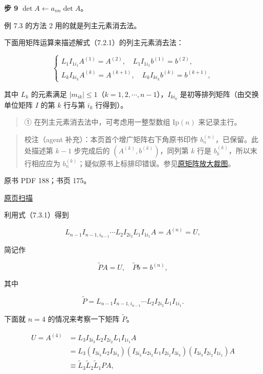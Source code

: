 \documentclass[
  10pt,
  fontset=fandol]{ctexart}
\begin{document}
\textbf{步 9} \(\det A\leftarrow a_{nn}\det A\)。

例 7.3 的方法 2 用的就是列主元素消去法。

下面用矩阵运算来描述解式（7.2.1）的列主元素消去法：

\[
\begin{cases}
L_1I_{1i_1}A^{(1)}=A^{(2)},\quad L_1I_{1i_1}b^{(1)}=b^{(2)},\\
L_kI_{ki_k}A^{(k)}=A^{(k+1)},\quad L_kI_{ki_k}b^{(k)}=b^{(k+1)},
\end{cases}
\tag{7.3.1}
\]

其中 \(L_k\) 的元素满足 \(|m_{ik}|\le1\)（\(k=1,2,\cdots,n-1\)），\(I_{ki_k}\) 是初等排列矩阵（由交换单位矩阵 \(I\) 的第 \(k\) 行与第 \(i_k\) 行得到）。

\begin{quote}
① 在列主元素消去法中，可考虑用一整型数组 \(\mathrm{Ip}(n)\) 来记录主行。
\end{quote}

\begin{quote}
校注（agent 补充）：本页首个增广矩阵右下角原书印作 \(b_n^{(n)}\)，已保留。此处描述第 \(k-1\) 步完成后的 \((A^{(k)},b^{(k)})\)，同列第 \(k\) 行是 \(b_k^{(k)}\)，所以末行相应应为 \(b_n^{(k)}\)；疑似原书上标排印错误。参见\href{/Users/xiangjunfeng/Desktop/数值计算专用/numerical-analysis/book/staging/ch07a/assets/pdf-187-rhs-detail.png}{原矩阵放大裁图}。
\end{quote}

\clearpage

原书 PDF 188；书页 175。

\href{/Users/xiangjunfeng/Desktop/数值计算专用/numerical-analysis/book/source-images/pdf-188.jpeg}{原页扫描}

利用式（7.3.1）得到

\[L_{n-1}I_{n-1,i_{n-1}}\cdots L_2I_{2i_2}L_1I_{1i_1}A=A^{(n)}=U,\]

简记作

\[\widetilde{P}A=U,\quad\widetilde{P}b=b^{(n)},\]

其中

\[\widetilde{P}=L_{n-1}I_{n-1,i_{n-1}}\cdots L_2I_{2i_2}L_1I_{1i_1}.\]

下面就 \(n=4\) 的情况来考察一下矩阵 \(\widetilde{P}\)。

\[
\begin{aligned}
U=A^{(4)}&=L_3I_{3i_3}L_2I_{2i_2}L_1I_{1i_1}A\\
&=L_3(I_{3i_3}L_2I_{3i_3})(I_{3i_3}L_{2i_2}L_1I_{2i_2}I_{3i_3})(I_{3i_3}I_{2i_2}I_{1i_1})A\\
&\equiv\widetilde{L}_3\widetilde{L}_2\widetilde{L}_1PA,
\end{aligned}
\tag{7.3.2}
\]
\end{document}
